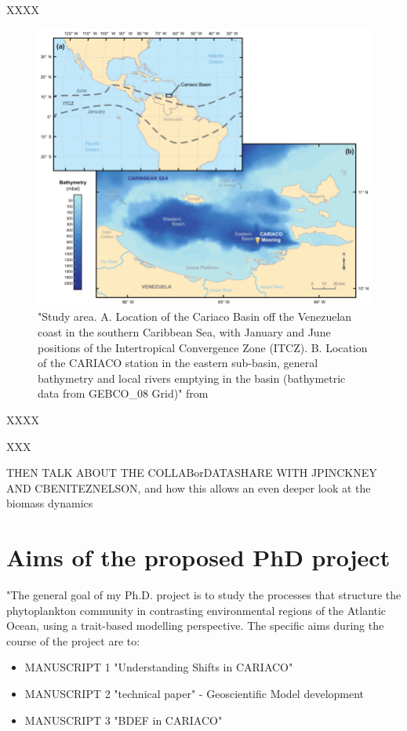  

XXXX


\begin{figure}
\centering
\includegraphics[trim = 0mm 0mm 0mm 0mm, clip, width=1.\linewidth]{./Chp1-Intro/CARIACObasinMAP_Bringueetal2018.png}
\caption[Scheme]{\small {"Study area. A. Location of the Cariaco Basin off the Venezuelan coast in the southern Caribbean Sea, with January and June positions of the Intertropical Convergence Zone (ITCZ). B. Location of the CARIACO station in the eastern sub-basin, general bathymetry and local rivers emptying in the basin (bathymetric data from GEBCO\_08 Grid)" from \cite{Bringue2019}}}
\label{CARIACO-map}
\end{figure}

XXXX

XXX

THEN TALK ABOUT THE COLLABorDATASHARE WITH JPINCKNEY AND CBENITEZNELSON, and how this allows an even deeper look at the biomass dynamics


\section{Aims of the proposed PhD project}
"The general goal of my Ph.D. project is to study the processes that structure the phytoplankton community in contrasting environmental regions of the Atlantic Ocean, using a trait-based modelling perspective. The specific aims during the course of the project are to:

\begin{itemize}
\item MANUSCRIPT 1 "Understanding Shifts in CARIACO"
\item MANUSCRIPT 2 "technical paper" - Geoscientific Model development
\item MANUSCRIPT 3 "BDEF in CARIACO"
\end{itemize}
